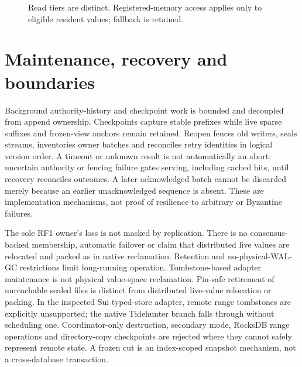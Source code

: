 \documentclass[11pt,a4paper]{article}
\begin{document}
\begin{figure}[htbp]\centering
{}
\caption{Read tiers are distinct. Registered-memory access applies only to eligible resident values; fallback is retained.}\label{fig:read}
\end{figure}

\section{Maintenance, recovery and boundaries}\label{sec:recovery}
Background authority-history and checkpoint work is bounded and decoupled from append ownership. Checkpoints capture stable prefixes while live sparse suffixes and frozen-view anchors remain retained. Reopen fences old writers, seals streams, inventories owner batches and reconciles retry identities in logical version order. A timeout or unknown result is not automatically an abort: uncertain authority or fencing failure gates serving, including cached hits, until recovery reconciles outcomes. A later acknowledged batch cannot be discarded merely because an earlier unacknowledged sequence is absent. These are implementation mechanisms, not proof of resilience to arbitrary or Byzantine failures.

The sole RF1 owner's loss is not masked by replication. There is no consensus-backed membership, automatic failover or claim that distributed live values are relocated and packed as in native reclamation. Retention and no-physical-WAL-GC restrictions limit long-running operation. Tombstone-based adapter maintenance is not physical value-space reclamation. Pin-safe retirement of unreachable sealed files is distinct from distributed live-value relocation or packing. In the inspected Sui typed-store adapter, remote range tombstones are explicitly unsupported; the native Tidehunter branch falls through without scheduling one. Coordinator-only destruction, secondary mode, RocksDB range operations and directory-copy checkpoints are rejected where they cannot safely represent remote state. A frozen cut is an index-scoped snapshot mechanism, not a cross-database transaction.
\end{document}

